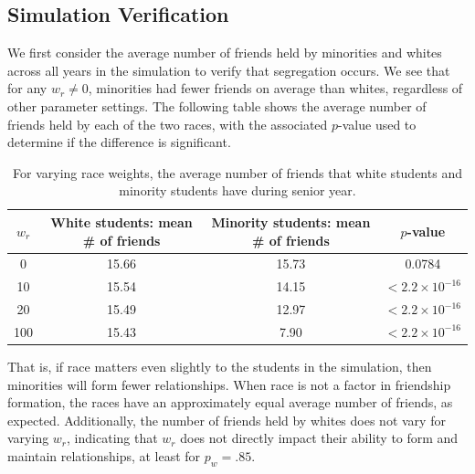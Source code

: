 \subsection{Simulation Verification}


We first consider the average number of friends held by minorities and whites
across all years in the simulation to verify that segregation occurs. We see 
that for any $w_r\neq 0$, minorities had fewer friends on average than whites,
regardless of other parameter settings. The following table shows the average
number of friends held by each of the two races, with the associated $p$-value
used to determine if the difference is significant.\\

\begin{table}[htb]
\centering
\caption{For varying race weights, the average number of friends that white
students and minority students have during senior
year.\label{friendshipsVsRaceWeight}}
\begin{tabular}{|c|c|c|c|}
\hline
$w_r$ & White students: mean \# of friends & Minority students: mean \# of
friends  & $p$-value\\
\hline
0 & 15.66 & 15.73 & 0.0784\\
10 & 15.54 & 14.15 & $<2.2\times 10^{-16}$\\
20 & 15.49 & 12.97 & $<2.2\times 10^{-16}$\\
100 & 15.43 & 7.90 & $<2.2\times 10^{-16}$\\
\hline
\end{tabular}
\end{table}

That is, if race matters even slightly to the students in the simulation, then
minorities will form fewer relationships. When race is not a factor in
friendship formation, the races have an approximately equal average number of
friends, as expected. Additionally, the number of friends held by whites does
not vary for varying $w_r$, indicating that $w_r$ does not directly impact
their ability to form and maintain relationships, at least for $p_w=.85$.


